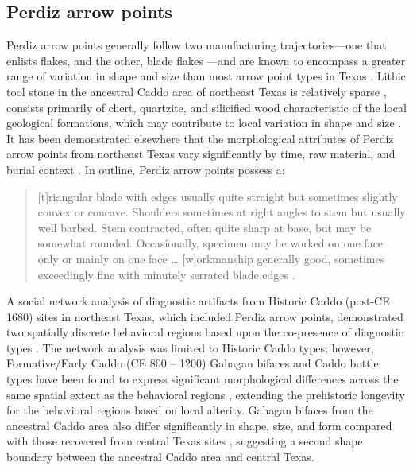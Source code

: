 \documentclass[smallextended]{svjour3}       %
\begin{document}
\hypertarget{perdiz-arrow-points}{%
\subsection{Perdiz arrow points}\label{perdiz-arrow-points}}

Perdiz arrow points generally follow two manufacturing
trajectories---one that enlists flakes, and the other, blade flakes
\cite{RN8999,RN9361,RN9000,RN9364}---and are known to encompass a
greater range of variation in shape and size than most arrow point types
in Texas \cite{RN7795,RN3149}. Lithic tool stone in the ancestral Caddo
area of northeast Texas is relatively sparse \cite[Figure 2]{RN9364},
consists primarily of chert, quartzite, and silicified wood
characteristic of the local geological formations, which may contribute
to local variation in shape and size \cite{RN9364,RN439}. It has been
demonstrated elsewhere that the morphological attributes of Perdiz arrow
points from northeast Texas vary significantly by time, raw material,
and burial context \cite{RN9364}. In outline, Perdiz arrow points
possess a:

\begin{quote}
{[}t{]}riangular blade with edges usually quite straight but sometimes
slightly convex or concave. Shoulders sometimes at right angles to stem
but usually well barbed. Stem contracted, often quite sharp at base, but
may be somewhat rounded. Occasionally, specimen may be worked on one
face only or mainly on one face \ldots{} {[}w{]}orkmanship generally
good, sometimes exceedingly fine with minutely serrated blade edges
\cite[504]{RN5769}.
\end{quote}

A social network analysis of diagnostic artifacts from Historic Caddo
(post-CE 1680) sites in northeast Texas, which included Perdiz arrow
points, demonstrated two spatially discrete behavioral regions based
upon the co-presence of diagnostic types \cite[Figure 12.4]{RN8031}. The
network analysis was limited to Historic Caddo types; however,
Formative/Early Caddo (CE 800 -- 1200) Gahagan bifaces and Caddo bottle
types have been found to express significant morphological differences
across the same spatial extent as the behavioral regions
\cite{RN8074,RN7927,RN8370,RN8312}, extending the prehistoric longevity
for the behavioral regions based on local alterity. Gahagan bifaces from
the ancestral Caddo area also differ significantly in shape, size, and
form compared with those recovered from central Texas sites
\cite{RN8322}, suggesting a second shape boundary between the ancestral
Caddo area and central Texas.
\end{document}
